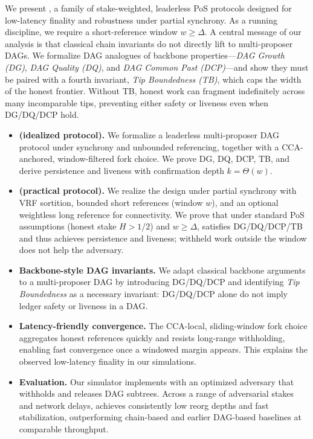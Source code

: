 We present \Proj, a family of stake-weighted, leaderless PoS protocols designed for low-latency finality and robustness under partial synchrony.
As a running discipline, we require a short-reference window $w\ge\Delta$. %
A central message of our analysis is that classical chain invariants do not directly lift to multi-proposer DAGs. We formalize DAG analogues of backbone properties---\emph{DAG Growth (DG)}, \emph{DAG Quality (DQ)}, and \emph{DAG Common Past (DCP)}---and show they must be paired with a fourth invariant, \emph{Tip Boundedness (TB)}, which caps the width of the honest frontier. Without TB, honest work can fragment indefinitely across many incomparable tips, preventing either safety or liveness even when DG/DQ/DCP hold.
\vspace{-.3cm}

\begin{itemize}
	\item \textbf{\ProjIdeal (idealized protocol).} We formalize a leaderless multi-proposer DAG protocol under synchrony and unbounded referencing, together with a CCA-anchored, window-filtered fork choice. We prove DG, DQ, DCP, TB, and derive persistence and liveness with confirmation depth $k = \Theta(w)$.
	\item \textbf{\ProjBase (practical protocol).} We realize the design under partial synchrony with VRF sortition, bounded short references (window $w$), and an optional weightless long reference for connectivity. We prove that under standard PoS assumptions (honest stake $H>1/2$) and $w \ge \Delta$, \ProjBase satisfies DG/DQ/DCP/TB and thus achieves persistence and liveness; withheld work outside the window does not help the adversary.
	\item \textbf{Backbone-style DAG invariants.} We adapt classical backbone arguments to a multi-proposer DAG by introducing DG/DQ/DCP and identifying \emph{Tip Boundedness} as a necessary invariant: DG/DQ/DCP alone do not imply ledger safety or liveness in a DAG.
	\item \textbf{Latency-friendly convergence.} The CCA-local, sliding-window fork choice aggregates honest references quickly and resists long-range withholding, enabling fast convergence once a windowed margin appears. This explains the observed low-latency finality in our simulations.
	\item \textbf{Evaluation.} Our simulator implements \ProjBase with an optimized adversary that withholds and releases DAG subtrees. Across a range of adversarial stakes and network delays, \Proj achieves consistently low reorg depths and fast stabilization, outperforming chain-based and earlier DAG-based baselines at comparable throughput.
\end{itemize}

